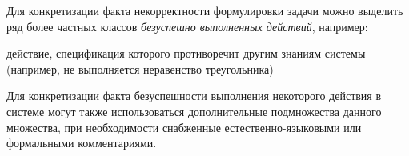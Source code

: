 \begin{SCn}
\begin{scnsubstruct}
\begin{scneqtoset}
{\begin{scnsubdividing}
{{\begin{scnitemize}
\end{scnitemize}
Для конкретизации факта некорректности формулировки задачи можно выделить ряд более частных классов \textit{безуспешно выполненных действий}, например:
\begin{scnitemize}
\item действие, спецификация которого противоречит другим знаниям системы (например, не выполняется неравенство треугольника)
\end{scnitemize}
Для конкретизации факта безуспешности выполнения некоторого действия в системе могут также использоваться дополнительные подмножества данного множества, при необходимости снабженные естественно-языковыми или формальными комментариями.}
}
\end{scnsubdividing}
}
\end{scneqtoset}
\begin{scneqtoset}


\end{scneqtoset}
\end{scnsubstruct}
\end{SCn}

